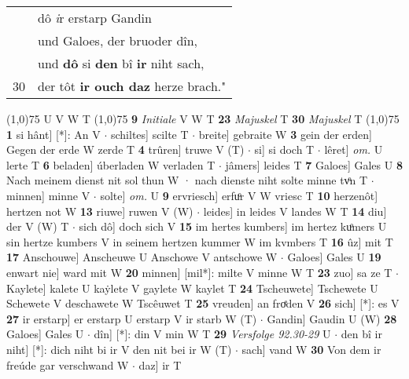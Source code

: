 \documentclass[8pt,a4paper,notitlepage]{article}
\begin{document}
\begin{table}[ht]
\begin{minipage}[t]{0.5\linewidth}
\begin{tabular}{rl}
 & dô \textit{i}r erstarp Gandin\\ 
 & und Galoes, der bruoder dîn,\\ 
 & und \textbf{dô} si \textbf{den} bî \textbf{ir} niht sach,\\ 
30 & der tôt \textbf{ir ouch daz} herze brach."\\ 
\end{tabular}
\scriptsize
\line(1,0){75} \newline
U V W T \newline
\line(1,0){75} \newline
\textbf{9} \textit{Initiale} V W T  \textbf{23} \textit{Majuskel} T  \textbf{30} \textit{Majuskel} T  \newline
\line(1,0){75} \newline
\textbf{1} si hânt] [*]: An V  $\cdot$ schiltes] scilte T  $\cdot$ breite] gebraite W \textbf{3} gein der erden] Gegen der erde W zerde T \textbf{4} trûren] truwe V (T)  $\cdot$ si] si doch T  $\cdot$ lêret] \textit{om.} U lerte T \textbf{6} beladen] úberladen W verladen T  $\cdot$ jâmers] leides T \textbf{7} Galoes] Gales U \textbf{8} Nach meinem dienst nit sol thun W · nach dienste niht solte minne tvͦn T  $\cdot$ minnen] minne V  $\cdot$ solte] \textit{om.} U \textbf{9} ervriesch] erfuͦr V W vriesc T \textbf{10} herzenôt] hertzen not W \textbf{13} riuwe] ruwen V (W)  $\cdot$ leides] in leides V landes W T \textbf{14} diu] der V (W) T  $\cdot$ sich dô] doch sich V \textbf{15} im hertes kumbers] im hertez kuͦmers U sin hertze kumbers V in seinem hertzen kummer W im kvmbers T \textbf{16} ûz] mit T \textbf{17} Anschouwe] Anscheuwe U Anschowe V antschowe W  $\cdot$ Galoes] Gales U \textbf{19} enwart nie] ward mit W \textbf{20} minnen] [mil*]: milte V minne W T \textbf{23} zuo] sa ze T  $\cdot$ Kaylete] kalete U kaẏlete V gaylete W kaylet T \textbf{24} Tscheuwete] Tschewete U Schewete V deschawete W Tscêuwet T \textbf{25} vreuden] an froͤden V \textbf{26} sich] [*]: es V \textbf{27} ir erstarp] er erstarp U erstarp V ir starb W (T)  $\cdot$ Gandin] Gaudin U (W) \textbf{28} Galoes] Gales U  $\cdot$ dîn] [*]: din V min W T \textbf{29} \textit{Versfolge 92.30-29} U   $\cdot$ den bî ir niht] [*]: dich niht bi ir V den nit bei ir W (T)  $\cdot$ sach] vand W \textbf{30} Von dem ir freúde gar verschwand W  $\cdot$ daz] ir T \newline
\end{minipage}
\end{table}
\end{document}
